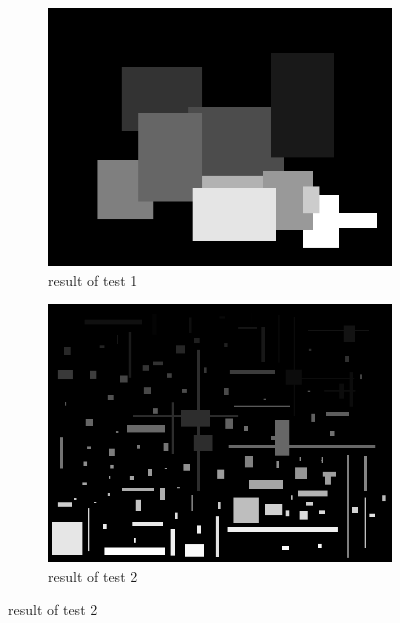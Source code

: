 \documentclass[a4paper, 11pt]{article}
\begin{document}
\begin{figure}[H]
    \centering
    \begin{subfigure}[b]{0.3\textwidth}
        \centering
        \includegraphics[width=\textwidth]{images/result/1.png}
        \caption{result of test 1}
    \end{subfigure}
    \hspace{5mm}
    \begin{subfigure}[b]{0.3\textwidth}
        \centering
        \includegraphics[width=\textwidth]{images/result/2.png}
        \caption{result of test 2}
    \end{subfigure}
    

\end{figure}
\end{document}
